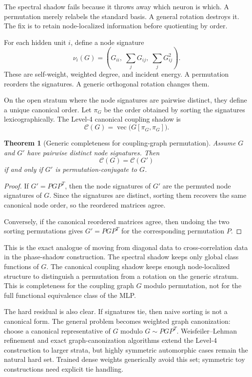 \documentclass[11pt]{article}
\newtheorem{theorem}{Theorem}
\newcommand{\vecop}{\operatorname{vec}}
\newcommand{\Canon}{\mathcal{C}}
\begin{document}
The spectral shadow fails because it throws away which neuron is which. A permutation merely relabels the standard basis. A general rotation destroys it. The fix is to retain node-localized information before quotienting by order.

For each hidden unit $i$, define a node signature
\begin{equation}
  \nu_i(G)=\left(G_{ii},\;\sum_jG_{ij},\;\sum_jG_{ij}^2\right).
  \label{eq:node-signature}
\end{equation}
These are self-weight, weighted degree, and incident energy. A permutation reorders the signatures. A generic orthogonal rotation changes them.

On the open stratum where the node signatures are pairwise distinct, they define a unique canonical order. Let $\pi_G$ be the order obtained by sorting the signatures lexicographically. The Level-4 canonical coupling shadow is
\begin{equation}
  \Canon(G)=\vecop\bigl(G[\pi_G,\pi_G]\bigr).
  \label{eq:canon-shadow}
\end{equation}

\begin{theorem}[Generic completeness for coupling-graph permutation]
Assume $G$ and $G'$ have pairwise distinct node signatures. Then
\[
\Canon(G)=\Canon(G')
\]
if and only if $G'$ is permutation-conjugate to $G$.
\end{theorem}

\begin{proof}
If $G'=PGP^T$, then the node signatures of $G'$ are the permuted node signatures of $G$. Since the signatures are distinct, sorting them recovers the same canonical node order, so the reordered matrices agree.

Conversely, if the canonical reordered matrices agree, then undoing the two sorting permutations gives $G'=PGP^T$ for the corresponding permutation $P$.
\end{proof}

This is the exact analogue of moving from diagonal data to cross-correlation data in the phase-shadow construction. The spectral shadow keeps only global class functions of $G$. The canonical coupling shadow keeps enough node-localized structure to distinguish a permutation from a rotation on the generic stratum. This is completeness for the coupling graph $G$ modulo permutation, not for the full functional equivalence class of the MLP.

The hard residual is also clear. If signatures tie, then naive sorting is not a canonical form. The general problem becomes weighted graph canonization: choose a canonical representative of $G$ modulo $G\sim PGP^T$. Weisfeiler--Lehman refinement and exact graph-canonization algorithms extend the Level-4 construction to larger strata, but highly symmetric automorphic cases remain the natural hard set. Trained dense weights generically avoid this set; symmetric toy constructions need explicit tie handling.
\end{document}

